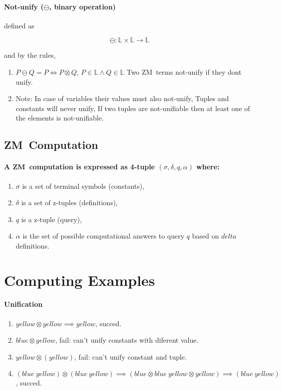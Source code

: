 \documentclass[11pt,a4paper]{report}
\newcommand{\zm}{ZM}
\newcommand{\unify}{\otimes}
\newcommand{\notUnify}{\ominus}
\begin{document}
\paragraph{Not-unify ($\notUnify$, binary operation)} defined as

\[
    \notUnify: \mathbb{L} \times \mathbb{L} \rightarrow \mathbb{L}
\]

and by the rules,

\begin{enumerate}
    \item $P \notUnify Q = P \iff \overline{P \unify Q}$, $P \in \mathbb{L} \wedge Q \in \mathbb{L}$
    \subitem Two \zm\ terms not-unify if they dont unify.
\item Note:
    \subitem In case of variables their values must also not-unify,
    \subitem Tuples and constants will never unify,
    \subitem If two tuples are not-unifiable then at least one of the elements is not-unifiable.
\end{enumerate}

\subsection{\zm\ Computation}
\paragraph{A \zm\ computation is expressed as 4-tuple $(\sigma, \delta, q, \alpha)$ where:}

\begin{enumerate}
\item $\sigma$ is a set of terminal symbols (constants),
\item $\delta$ is a set of z-tuples (definitions),
\item $q$ is a z-tuple (query),
\item $\alpha$ is the set of possible computational answers to query $q$ based on $delta$ definitions.
\end{enumerate}

\section{Computing Examples}

\paragraph{Unification}
\begin{enumerate}
\item $yellow \unify yellow \implies yellow$, succed.
\item $blue \unify yellow$, fail: can't unify constants with diferent value.
\item $yellow \unify (yellow)$, fail: can't unify constant and tuple.
\item $(blue\ yellow) \unify (blue\ yellow) \implies (blue \unify blue\ yellow \unify yellow) \implies (blue\ yellow)$, succed.
\end{enumerate}
\end{document}
